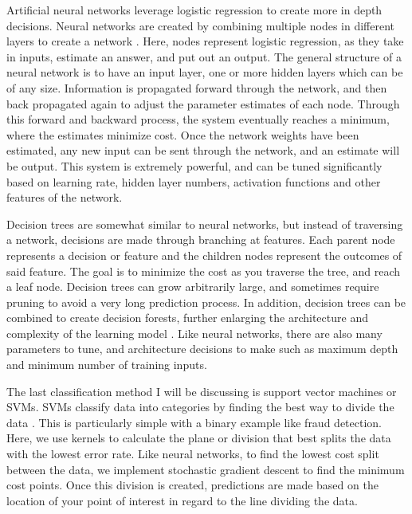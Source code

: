 \documentclass[midd]{thesis}
\begin{document}

Artificial neural networks leverage logistic regression to create more in depth decisions. Neural networks are created by combining multiple nodes in different layers to create a network \cite{Suryansh}. Here, nodes represent logistic regression, as they take in inputs, estimate an answer, and put out an output. The general structure of a neural network is to have an input layer, one or more hidden layers which can be of any size. Information is propagated forward through the network, and then back propagated again to adjust the parameter estimates of each node. Through this forward and backward process, the system eventually reaches a minimum, where the estimates minimize cost. Once the network weights have been estimated, any new input can be sent through the network, and an estimate will be output. This system is extremely powerful, and can be tuned significantly based on learning rate, hidden layer numbers, activation functions and other features of the network. 

Decision trees are somewhat similar to neural networks, but instead of traversing a network, decisions are made through branching at features. Each parent node represents a decision or feature and the children nodes represent the outcomes of said feature. The goal is to minimize the cost as you traverse the tree, and reach a leaf node. Decision trees can grow arbitrarily large, and sometimes require pruning to avoid a very long prediction process. In addition, decision trees can be combined to create decision forests, further enlarging the architecture and complexity of the learning model \cite{Gupta}. Like neural networks, there are also many parameters to tune, and architecture decisions to make such as maximum depth and minimum number of training inputs.

The last classification method I will be discussing is support vector machines or SVMs. SVMs classify data into categories by finding the best way to divide the data \cite{Brownlee}. This is particularly simple with a binary example like fraud detection. Here, we use kernels to calculate the plane or division that best splits the data with the lowest error rate. Like neural networks, to find the lowest cost split between the data, we implement stochastic gradient descent to find the minimum cost points. Once this division is created, predictions are made based on the location of your point of interest in regard to the line dividing the data. 
\end{document}
